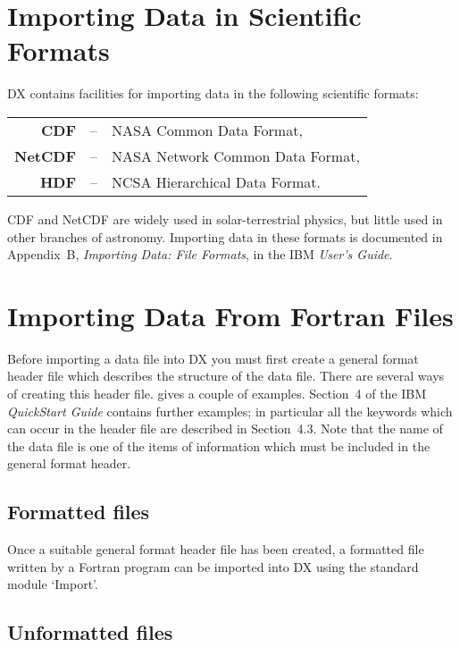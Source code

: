 \section{Importing Data in Scientific Formats  }

DX contains facilities for importing data in the following scientific
formats:

\begin{center}
\begin{tabular}{rcl}
{\bf CDF}    & -- & NASA Common Data Format,         \\
{\bf NetCDF} & -- & NASA Network Common Data Format, \\
{\bf HDF}    & -- & NCSA Hierarchical Data Format.   \\
\end{tabular}
\end{center}

CDF and NetCDF are widely used in solar-terrestrial physics, but little
used in other branches of astronomy. Importing data in these formats is
documented in Appendix~B, {\it Importing Data: File Formats}, in the IBM
{\it User's Guide}\cite{USERG}.


\section{Importing Data From Fortran Files  }

Before importing a data file into DX you must first create a general
format header file which describes the structure of the data file.
There are several ways of creating this header file. 
\cite{SC2}
gives a couple of examples. Section~4 of the IBM {\it
QuickStart Guide}\cite{QUICKS} contains further examples; in particular
all the keywords which can occur in the header file are described in
Section~4.3. Note that the name of the data file is one of the items of
information which must be included in the general format header.


\subsection{Formatted files}

Once a suitable general format header file has been created, a formatted 
file written by a Fortran program can be imported into DX using the
standard module `Import'.

\subsection{Unformatted files}

